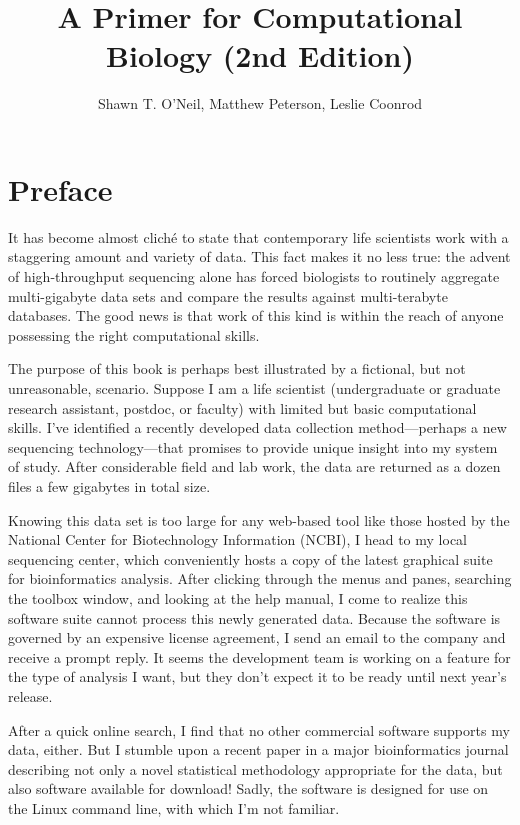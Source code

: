 \documentclass[
]{memoir}
\title{A Primer for Computational Biology (2nd Edition)}
\author{Shawn T. O'Neil, Matthew Peterson, Leslie Coonrod}
\date{}
\begin{document}
\maketitle

{
\setcounter{tocdepth}{1}
\tableofcontents
}

\hypertarget{preface}{%
\chapter*{Preface}\label{preface}}

It has become almost cliché to state that contemporary life scientists work with a staggering amount and variety of data. This fact makes it no less true: the advent of high-throughput sequencing alone has forced biologists to routinely aggregate multi-gigabyte data sets and compare the results against multi-terabyte databases. The good news is that work of this kind is within the reach of anyone possessing the right computational skills.

The purpose of this book is perhaps best illustrated by a fictional, but not unreasonable, scenario. Suppose I am a life scientist (undergraduate or graduate research assistant, postdoc, or faculty) with limited but basic computational skills. I've identified a recently developed data collection method---perhaps a new sequencing technology---that promises to provide unique insight into my system of study. After considerable field and lab work, the data are returned as a dozen files a few gigabytes in total size.

Knowing this data set is too large for any web-based tool like those hosted by the National Center for Biotechnology Information (NCBI), I head to my local sequencing center, which conveniently hosts a copy of the latest graphical suite for bioinformatics analysis. After clicking through the menus and panes, searching the toolbox window, and looking at the help manual, I come to realize this software suite cannot process this newly generated data. Because the software is governed by an expensive license agreement, I send an email to the company and receive a prompt reply. It seems the development team is working on a feature for the type of analysis I want, but they don't expect it to be ready until next year's release.

After a quick online search, I find that no other commercial software supports my data, either. But I stumble upon a recent paper in a major bioinformatics journal describing not only a novel statistical methodology appropriate for the data, but also software available for download! Sadly, the software is designed for use on the Linux command line, with which I'm not familiar.
\end{document}
